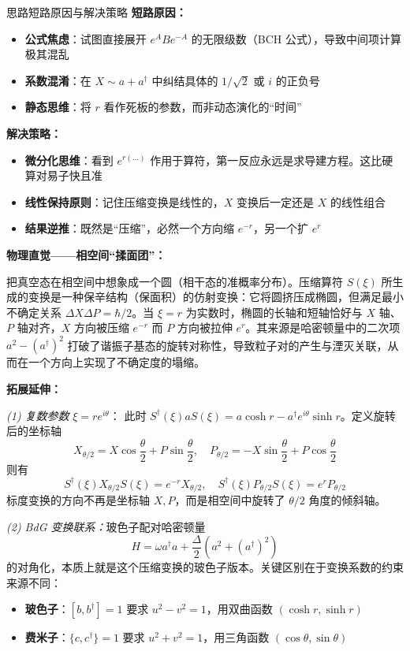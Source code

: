 \begin{errorbox}[colback=white]{思路短路原因与解决策略}
\textbf{短路原因：}
\begin{itemize}
    \item \textbf{公式焦虑}：试图直接展开 $e^A B e^{-A}$ 的无限级数（BCH 公式），导致中间项计算极其混乱
    \item \textbf{系数混淆}：在 $X \sim a+a^\dagger$ 中纠结具体的 $1/\sqrt{2}$ 或 $i$ 的正负号
    \item \textbf{静态思维}：将 $r$ 看作死板的参数，而非动态演化的``时间''
\end{itemize}

\textbf{解决策略：}
\begin{itemize}
    \item \textbf{微分化思维}：看到 $e^{r(\dots)}$ 作用于算符，第一反应永远是求导建方程。这比硬算对易子快且准
    \item \textbf{线性保持原则}：记住压缩变换是线性的，$X$ 变换后一定还是 $X$ 的线性组合
    \item \textbf{结果逆推}：既然是``压缩''，必然一个方向缩 $e^{-r}$，另一个扩 $e^{r}$
\end{itemize}
\end{errorbox}

\begin{insightbox}[举一反三与物理直觉]
\textbf{物理直觉——相空间``揉面团''：}

把真空态在相空间中想象成一个圆（相干态的准概率分布）。压缩算符 $S(\xi)$ 所生成的变换是一种保辛结构（保面积）的仿射变换：它将圆挤压成椭圆，但满足最小不确定关系 $\Delta X \Delta P = \hbar/2$。当 $\xi = r$ 为实数时，椭圆的长轴和短轴恰好与 $X$ 轴、$P$ 轴对齐，$X$ 方向被压缩 $e^{-r}$ 而 $P$ 方向被拉伸 $e^{r}$。其来源是哈密顿量中的二次项 $a^2 - (a^\dagger)^2$ 打破了谐振子基态的旋转对称性，导致粒子对的产生与湮灭关联，从而在一个方向上实现了不确定度的塌缩。

\textbf{拓展延伸：}

\textit{(1) 复数参数} $\xi = r e^{i\theta}$：
此时 $S^\dagger(\xi) a S(\xi) = a \cosh r - a^\dagger e^{i\theta} \sinh r$。定义旋转后的坐标轴
\[
X_{\theta/2} = X \cos\frac{\theta}{2} + P \sin\frac{\theta}{2}, \quad
P_{\theta/2} = -X \sin\frac{\theta}{2} + P \cos\frac{\theta}{2}
\]
则有
\[
S^\dagger(\xi) X_{\theta/2} S(\xi) = e^{-r} X_{\theta/2}, \quad
S^\dagger(\xi) P_{\theta/2} S(\xi) = e^{r} P_{\theta/2}
\]
标度变换的方向不再是坐标轴 $X, P$，而是相空间中旋转了 $\theta/2$ 角度的倾斜轴。

\textit{(2) BdG 变换联系：}玻色子配对哈密顿量
\[
H = \omega a^\dagger a + \frac{\Delta}{2}\left( a^2 + (a^\dagger)^2 \right)
\]
的对角化，本质上就是这个压缩变换的玻色子版本。关键区别在于变换系数的约束来源不同：
\begin{itemize}[leftmargin=12pt, nosep]
    \item \textbf{玻色子}：$[b, b^\dagger] = 1$ 要求 $u^2 - v^2 = 1$，用双曲函数 $(\cosh r, \sinh r)$
    \item \textbf{费米子}：$\{c, c^\dagger\} = 1$ 要求 $u^2 + v^2 = 1$，用三角函数 $(\cos\theta, \sin\theta)$
\end{itemize}
\end{insightbox}

